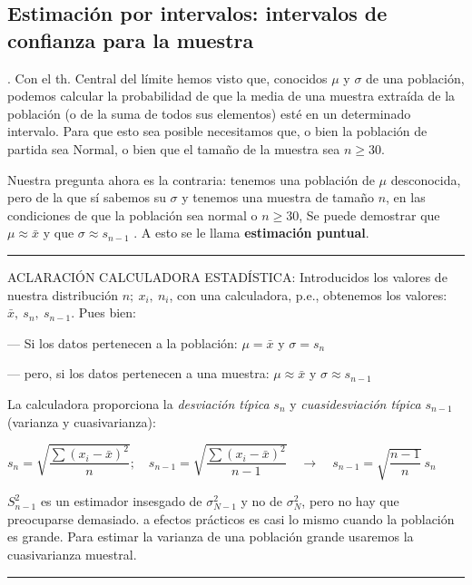 \subsection{Estimación por intervalos: intervalos de confianza para la muestra}


\begin{definition}
.	Con el th. Central del límite hemos visto que, conocidos $\mu$ y $\sigma$ de una población, podemos calcular la probabilidad de que la media de una muestra extraída de la población (o de la suma de todos sus elementos) esté en un determinado intervalo. Para que esto sea posible necesitamos que, o bien la población de partida sea Normal, o bien que el tamaño de la muestra sea $n\ge 30$.

	Nuestra pregunta ahora es la contraria: tenemos una población de $\mu$  desconocida, pero de la que sí sabemos su $\sigma$ y tenemos una muestra de tamaño $n$, en las condiciones de que la población sea normal o $n\ge 30$,  Se puede demostrar que $\mu\approx \bar x$  y que $\sigma \approx s_{n-1}$ .  A esto se le llama \textbf{estimación puntual}.
\end{definition}


\vspace{4mm}%
\rule{200pt}{0.1pt}

ACLARACIÓN CALCULADORA ESTADÍSTICA: Introducidos los valores de nuestra distribución $n;\ x_i,\ n_i$, con una calculadora, p.e., obtenemos los valores:  $\bar x, \ s_n, \ s_{n-1}$.  Pues bien:

--- Si los datos pertenecen a la población: $\mu=\bar x$    y  $\sigma=s_n$
  
--- pero, si los datos pertenecen a una muestra:  $\mu \approx \bar x$  y  $\sigma \approx s_{n-1}$ 

La calculadora proporciona la \emph{desviación típica} $s_n$   y \emph{cuasidesviación típica}  $s_{n-1}$ (varianza y cuasivarianza):

$ \displaystyle s_n=\sqrt{\dfrac{\sum (x_i-\bar x)^2}{n}}; \quad s_{n-1}=\sqrt{\dfrac{\sum (x_i-\bar x)^2}{n-1}} \quad \to \quad s_{n-1}=\sqrt{\dfrac{n-1}{n}}\ s_n$

$S^2_{n-1}$ es un estimador insesgado de $\sigma^2_{N-1}$ y no de $\sigma^2_{N}$, pero no hay que preocuparse demasiado. a efectos prácticos es casi lo mismo cuando la población es grande. Para estimar la varianza  de una población grande usaremos la cuasivarianza muestral.

\vspace{-4mm}%
\begin{flushright}
\rule{200pt}{0.1pt}	
\end{flushright}



